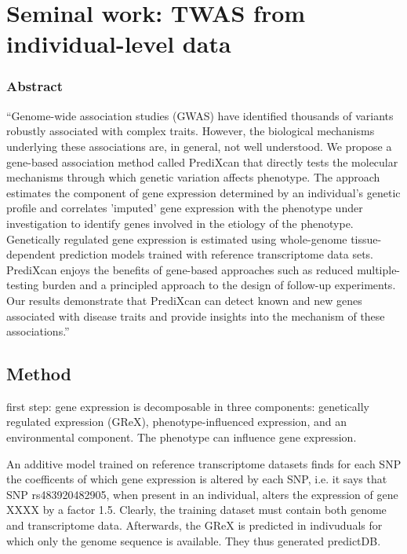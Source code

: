 \documentclass[../main.tex]{subfiles}
\begin{document}
\chapter{Seminal work: TWAS from individual-level data}

\subsection{Abstract}

\enquote{\footnotesize Genome-wide association studies (GWAS) have 
	identified thousands of variants robustly associated with complex 
	traits. However, the biological mechanisms underlying these 
	associations are, in general, not well understood. We propose a 
	gene-based association method called PrediXcan that directly tests 
	the molecular mechanisms through which genetic variation affects 
	phenotype. The approach estimates the component of gene expression 
	determined by an individual's genetic profile and correlates 
	'imputed' gene expression with the phenotype under investigation to 
	identify genes involved in the etiology of the phenotype. 
	Genetically regulated gene expression is estimated using 
	whole-genome tissue-dependent prediction models trained with 
	reference transcriptome data sets. PrediXcan enjoys the benefits of 
	gene-based approaches such as reduced multiple-testing burden and a 
	principled approach to the design of follow-up experiments. Our 
	results demonstrate that PrediXcan can detect known and new genes 
	associated with disease traits and provide insights into the 
	mechanism of these associations.}

\section{Method}

first step: gene expression is decomposable in three components: genetically
regulated expression (GReX), phenotype-influenced expression, and an
environmental component. The phenotype can influence gene expression.

An additive model trained on reference transcriptome datasets finds for each
SNP the coefficents of which gene expression is altered by each SNP, i.e. it
says that SNP rs483920482905, when present in an individual, alters the
expression of gene XXXX by a factor 1.5. Clearly, the training dataset must
contain both genome and transcriptome data. Afterwards, the GReX is predicted
in indivuduals for which only the genome sequence is available. They thus
generated predictDB.
\end{document}
